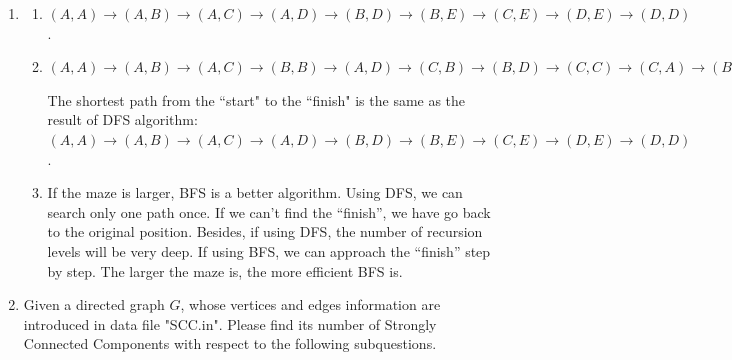 \documentclass[12pt,a4paper]{article}
\makeatletter
\newtheorem*{solution}{Solution}
\theoremstyle{definition}
\renewenvironment{solution}[1][Solution] {\par\pushQED{\qed}\normalfont\topsep6\p@\@plus6\p@\relax\trivlist\item[\hskip\labelsep\bfseries#1\@addpunct{.}]\ignorespaces}{\popQED\endtrivlist\@endpefalse} \makeatother
\makeatother
\begin{document}
\begin{enumerate}
	\begin{solution}
		\begin{enumerate}
			\item $ (A,A) \rightarrow (A,B) \rightarrow (A,C) \rightarrow (A,D) \rightarrow (B,D) \rightarrow (B,E) \rightarrow (C,E) \rightarrow (D,E) \rightarrow (D,D)$.
			\item $ (A,A) \rightarrow (A,B) \rightarrow (A,C) \rightarrow (B,B) \rightarrow (A,D) \rightarrow (C,B) \rightarrow (B,D) \rightarrow (C,C) \rightarrow (C,A) \rightarrow (B,E) \rightarrow (D,A) \rightarrow (C,E) \rightarrow (E,A) \rightarrow (D,E) \rightarrow (E,B) \rightarrow (D,D) $
			
			The shortest path from the ``start" to the ``finish" is the same as the result of DFS algorithm:  $ (A,A) \rightarrow (A,B) \rightarrow (A,C) \rightarrow (A,D) \rightarrow (B,D) \rightarrow (B,E) \rightarrow (C,E) \rightarrow (D,E) \rightarrow (D,D)$.
			\item If the maze is larger, BFS is a better algorithm. Using DFS, we can search only one path once.  If we can't find the ``finish'', we have go back to the original position. Besides, if using DFS, the number of recursion levels will be very deep. If using BFS, we can approach the ``finish'' step by step. The larger the maze is, the more efficient BFS is.
		\end{enumerate}
	\end{solution}
	\item Given a directed graph $G$, whose vertices and edges information are introduced in data file "SCC.in". Please find its number of Strongly Connected Components with respect to the following subquestions.
    

\end{enumerate}
\end{document}

